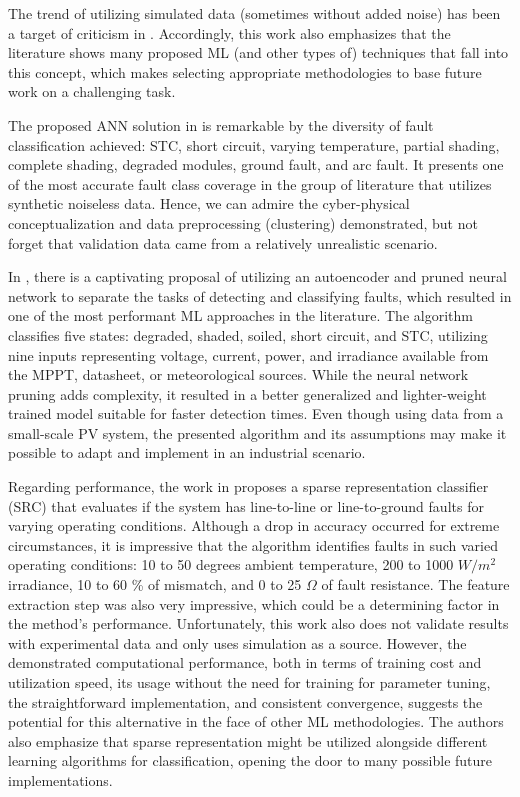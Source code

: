 The trend of utilizing simulated data (sometimes without added noise) has been a target of criticism in \cite{Aziz2020}. Accordingly, this work also emphasizes that the literature shows many proposed ML (and other types of) techniques that fall into this concept, which makes selecting appropriate methodologies to base future work on a challenging task.

The proposed ANN solution in \cite{Rao2019} is remarkable by the diversity of fault classification achieved: STC, short circuit, varying temperature, partial shading, complete shading, degraded modules, ground fault, and arc fault. It presents one of the most accurate fault class coverage in the group of literature that utilizes synthetic noiseless data. Hence, we can admire the cyber-physical conceptualization and data preprocessing (clustering) demonstrated, but not forget that validation data came from a relatively unrealistic scenario. 

In \cite{Rao2021}, there is a captivating proposal of utilizing an autoencoder and pruned neural network to separate the tasks of detecting and classifying faults, which resulted in one of the most performant ML approaches in the literature. The algorithm classifies five states: degraded, shaded, soiled, short circuit, and STC, utilizing nine inputs representing voltage, current, power, and irradiance available from the MPPT, datasheet, or meteorological sources. While the neural network pruning adds complexity, it resulted in a better generalized and lighter-weight trained model suitable for faster detection times. Even though using data from a small-scale PV system, the presented algorithm and its assumptions may make it possible to adapt and implement in an industrial scenario.

Regarding performance, the work in \cite{Kilic2020} proposes a sparse representation classifier (SRC) that evaluates if the system has line-to-line or line-to-ground faults for varying operating conditions. Although a drop in accuracy occurred for extreme circumstances, it is impressive that the algorithm identifies faults in such varied operating conditions: 10 to 50 degrees ambient temperature, 200 to 1000 $W/m^2$ irradiance, 10 to 60 \% of mismatch, and 0 to 25 $\Omega$ of fault resistance. The feature extraction step was also very impressive, which could be a determining factor in the method's performance. Unfortunately, this work also does not validate results with experimental data and only uses simulation as a source. However, the demonstrated computational performance, both in terms of training cost and utilization speed, its usage without the need for training for parameter tuning, the straightforward implementation, and consistent convergence, suggests the potential for this alternative in the face of other ML methodologies. The authors also emphasize that sparse representation might be utilized alongside different learning algorithms for classification, opening the door to many possible future implementations.

